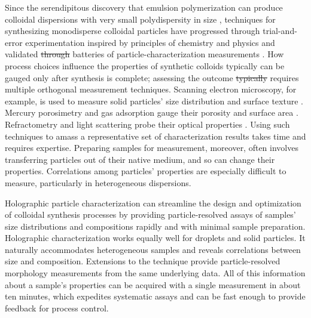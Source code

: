 \documentclass[journal=langd5,manuscript=article]{achemso}
\providecommand{\DIFadd}[1]{{\protect\color{blue}\uwave{#1}}} %
\providecommand{\DIFdel}[1]{{\protect\color{red}\sout{#1}}}                      %
\providecommand{\DIFaddbegin}{} %
\providecommand{\DIFaddend}{} %
\providecommand{\DIFdelbegin}{} %
\providecommand{\DIFdelend}{} %
\begin{document}
Since the serendipitous discovery that emulsion polymerization
can produce colloidal dispersions with very small polydispersity
in size
\cite{backus1949small,gerould1950comments},
techniques for synthesizing
monodisperse colloidal particles have progressed
through trial-and-error experimentation
inspired by principles of chemistry and physics 
and validated \DIFdelbegin \DIFdel{through }\DIFdelend \DIFaddbegin \DIFadd{by }\DIFaddend batteries of particle-characterization
measurements 
\cite{vanderhoff1956some,stober1968controlled,kotera1970colloid,dezelic1970preparation,goodwin1974studies,antl1986preparation}.
How process choices influence the properties of synthetic colloids
typically can be gauged only after
synthesis is complete;
assessing the outcome \DIFdelbegin \DIFdel{typically }\DIFdelend \DIFaddbegin \DIFadd{often }\DIFaddend requires
multiple orthogonal measurement techniques.
Scanning electron microscopy, for example, is used to measure
solid particles' size distribution and surface texture \cite{yamada85}.
Mercury porosimetry and gas adsorption gauge their porosity
\cite{giesche2006mercury} and surface area \cite{rouquerol1994}. 
Refractometry and light scattering probe their optical properties
\cite{chou54}.
Using such techniques to amass a representative 
set of characterization results
takes time and requires expertise.
Preparing samples for measurement, moreover, often involves
transferring particles out of their native medium,
and so can change their properties.
Correlations among particles' properties are especially
difficult to measure, particularly in heterogeneous
dispersions.

Holographic particle characterization can streamline
the design and optimization of colloidal synthesis processes
by providing particle-resolved assays of samples' size distributions
and compositions rapidly and with minimal sample preparation.
Holographic characterization works equally
well for droplets and solid particles. It naturally accommodates heterogeneous
samples and reveals correlations between size and composition. Extensions to the technique
provide particle-resolved morphology measurements from the same underlying data.
All of this information about a sample's properties can be acquired with a
single measurement in about ten minutes, which
expedites systematic assays and can be fast enough to provide feedback
for process control.
\end{document}
